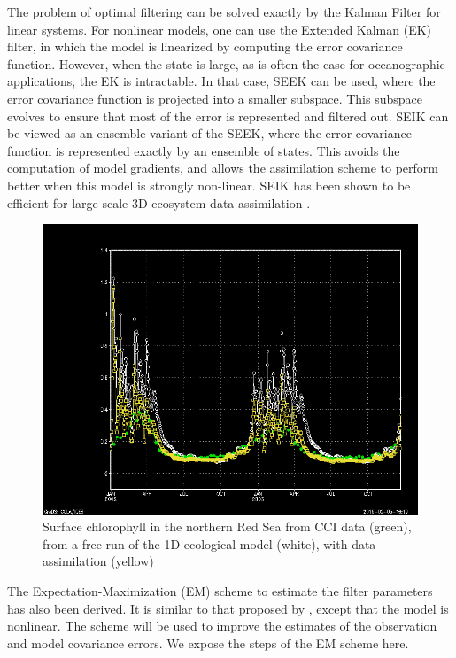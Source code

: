 The problem of optimal filtering can be solved exactly by the Kalman Filter for
linear systems. For nonlinear models, one can use the Extended Kalman (EK)
filter, in which the model is linearized by computing the error covariance
function.  However, when the state is large, as is often the case for
oceanographic applications, the EK is intractable. In that case, SEEK can be
used, where the error covariance function is projected into a smaller subspace.
This subspace evolves to ensure that most of the error is represented and
filtered out. SEIK can be viewed as an ensemble variant of the SEEK, where the
error covariance function is represented exactly by an ensemble of states. This
avoids the computation of model gradients, and allows the assimilation scheme
to perform better when this model is strongly non-linear. SEIK has been shown
to be efficient for large-scale 3D ecosystem data assimilation
\citep{Triantafyllou2003}.

\begin{figure}
    \centering
    \includegraphics[scale=.45]{figures/chl_factor.png}
    \caption{Surface chlorophyll in the northern Red Sea from CCI data (green),
             from a free run of the 1D ecological model (white), with data
             assimilation (yellow)}
    \label{assim}
\end{figure}

The Expectation-Maximization (EM) scheme to estimate the filter parameters has
also been derived. It is similar to that proposed by \citet{Tandeo2014}, except
that the model is nonlinear. The scheme will be used to improve the estimates
of the observation and model covariance errors. We expose the steps of the EM
scheme here.

